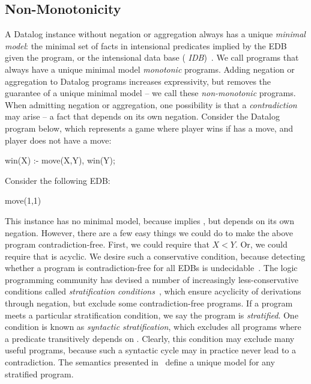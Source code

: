 \subsection{Non-Monotonicity}

A Datalog instance without negation or aggregation always has a unique {\em
minimal model}: the minimal set of facts in intensional predicates implied by
the EDB given the program, or the intensional data base ({\em
IDB})~\cite{ullmanbook}.  We call programs that always have a unique minimal
model {\em monotonic} programs.  Adding negation or aggregation to Datalog
programs increases expressivity, but removes the guarantee of a
unique minimal model -- we call these {\em non-monotonic} programs.  When
admitting negation or aggregation, one possibility is that a {\em
contradiction} may arise -- a fact that depends on its own negation.  Consider
the Datalog program below, which represents a game where player 
wins if has a move, and player  does not have a move:

\begin{Dedalus}
win(X) :- move(X,Y), \lnot win(Y);
\end{Dedalus}

Consider the following EDB:

\begin{Dedalus}
move(1,1)
\end{Dedalus}

This instance has no minimal model, because  implies
, but  depends on its own negation.  However,
there are a few easy things we could do to make the above program
contradiction-free.  First, we could require that $X < Y$.  Or, we could
require that  is acyclic.  We desire such a conservative
condition, because detecting whether a program is contradiction-free for all
EDBs is undecidable~\cite{papa-yanna}.  The logic programming community has
devised a number of increasingly less-conservative conditions called {\em
stratification conditions}~\cite{local-strat, ross-syntactic, modular,
weak-strat}, which ensure acyclicity of derivations through negation, but
exclude some contradiction-free programs.  If a program meets a particular
stratification condition, we say the program is {\em stratified}.  One
condition is known as {\em syntactic stratification}, which excludes all
programs where a predicate  transitively depends on
.  Clearly, this condition may exclude many useful
programs, because such a syntactic cycle may in practice never lead to a
contradiction.  The semantics presented in~\cite{wellfounded} define a unique
model for any stratified program.

